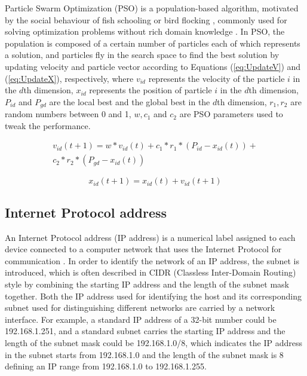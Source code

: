 \documentclass[conference]{IEEEtran}
\begin{document}
Particle Swarm Optimization (PSO) is a population-based algorithm, motivated by the social behaviour of fish schooling or bird flocking \cite{PSOIntro:Kennedy} \cite{PSOIntro:Eberhart}, commonly used for solving optimization problems without rich domain knowledge \cite{PSOIntro:Yanan}. In PSO, the population is composed of a certain number of particles each of which represents a solution, and particles fly in the search space to find the best solution by updating velocity and particle vector according to Equations (\ref{eq:UpdateV}) and (\ref{eq:UpdateX}), respectively, where $v_{id}$ represents the velocity of the particle $i$ in the $d$th dimension, $x_{id}$ represents the position of particle $i$ in the $d$th dimension, $P_{id}$ and $P_{gd}$ are the local best and the global best in the $d$th dimension, $r_{1}, r_{2}$ are random numbers between 0 and 1, $w, c_{1}$ and $c_{2}$ are PSO parameters used to tweak the performance. 

\begin{equation}\label{eq:UpdateV}
	\begin{aligned}
	v_{id}(t+1) = w * v_{id}(t) + c_{1} * r_{1} * (P_{id} - x_{id}(t)) + \\
	c_{2} * r_{2} * (P_{gd} - x_{id}(t))
	\end{aligned}
\end{equation}

\begin{equation}\label{eq:UpdateX}
	x_{id}(t+1) = x_{id}(t) + v_{id}(t+1)
\end{equation}

\subsection{Internet Protocol address}\label{sec:IPAddress}

An Internet Protocol address (IP address) is a numerical label assigned to each device connected to a computer network that uses the Internet Protocol for communication \cite{IP:Postel}. In order to identify the network of an IP address, the subnet is introduced, which is often described in CIDR (Classless Inter-Domain Routing) style \cite{CIDR:Fuller} by combining the starting IP address and the length of the subnet mask together. Both the IP address used for identifying the host and its corresponding subnet used for distinguishing different networks are carried by a network interface. For example, a standard IP address of a 32-bit number could be 192.168.1.251, and a standard subnet carries the starting IP address and the length of the subnet mask could be 192.168.1.0/8, which indicates the IP address in the subnet starts from 192.168.1.0 and the length of the subnet mask is 8 defining an IP range from 192.168.1.0 to 192.168.1.255. 
\end{document}
